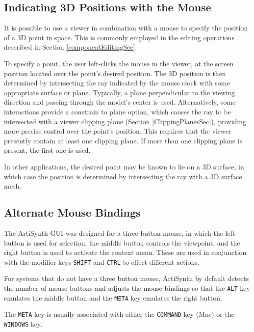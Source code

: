 \documentclass{article}
\begin{document}
\subsection{Indicating 3D Positions with the Mouse}
\label{indicatingPositionsSec}

It is possible to use a viewer in combination with a mouse to specify the
position of a 3D point in space. This is commonly employed in the
editing operations described in Section \ref{componentEditingSec}.

To specify a point, the user left-clicks the mouse in the viewer, at
the screen position located over the point's desired position. The 3D
position is then determined by intersecting the ray indicated by the
mouse clock with some appropriate surface or plane. Typically, a plane
perpendicular to the viewing direction and passing through the model's
center is used. Alternatively, some interactions provide a {\sf constrain
to plane} option, which causes the ray to be intersected with a viewer
clipping plane (Section \ref{ClippingPlanesSec}), providing more precise control
over the point's position. This requires that the viewer presently
contain at least one clipping plane. If more than one clipping plane
is present, the first one is used.

In other applications, the desired point may be known to lie on a 3D
surface, in which case the position is determined by intersecting the
ray with a 3D surface mesh.

\subsection{Alternate Mouse Bindings}
\label{MouseBindingsSec}

The ArtiSynth GUI was designed for a three-button mouse, in which the
left button is used for selection, the middle button controls the
viewpoint, and the right button is used to activate the context
menu. These are used in conjunction with the modifier keys {\tt SHIFT}
and {\tt CTRL} to effect different actions.  

For systems that do not have a three button mouse, ArtiSynth by
default detects the number of mouse buttons and adjusts the mouse
bindings so that the {\tt ALT} key emulates the middle button and the
{\tt META} key emulates the right button.

\begin{sideblock}
The {\tt META} key is usually associated with either the {\tt COMMAND}
key (Mac) or the {\tt WINDOWS} key.
\end{sideblock}
\end{document}
